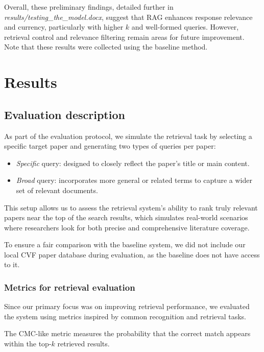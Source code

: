 \documentclass[fleqn,moreauthors,10pt]{ds_report}
\begin{document}
Overall, these preliminary findings, detailed further in \textit{results/testing\_the\_model.docx},
 suggest that RAG enhances response relevance and currency, particularly with higher $k$
  and well-formed queries. However, retrieval control and relevance filtering remain
  areas for future improvement. Note that these results were collected using the baseline method. 
  
\section*{Results}

\subsection*{Evaluation description}

As part of the evaluation protocol, we simulate the retrieval task by selecting a specific target paper
and generating two types of queries per paper:

\begin{itemize}
    \item \textit{Specific} query: designed to closely reflect the paper’s title or main content.
    \item \textit{Broad} query: incorporates more general or related terms to capture a wider set of relevant documents.
\end{itemize}

This setup allows us to assess the retrieval system’s ability to rank truly relevant papers near the top of the search results,
which simulates real-world scenarios where researchers look for both precise and comprehensive literature coverage.

To ensure a fair comparison with the baseline system, we did not include our local CVF paper database during evaluation,
as the baseline does not have access to it.

\subsubsection*{Metrics for retrieval evaluation}

Since our primary focus was on improving retrieval performance, 
we evaluated the system using metrics inspired by common recognition and retrieval tasks.

The CMC-like metric measures the probability 
that the correct match appears within the top-$k$ retrieved results. 
\end{document}

